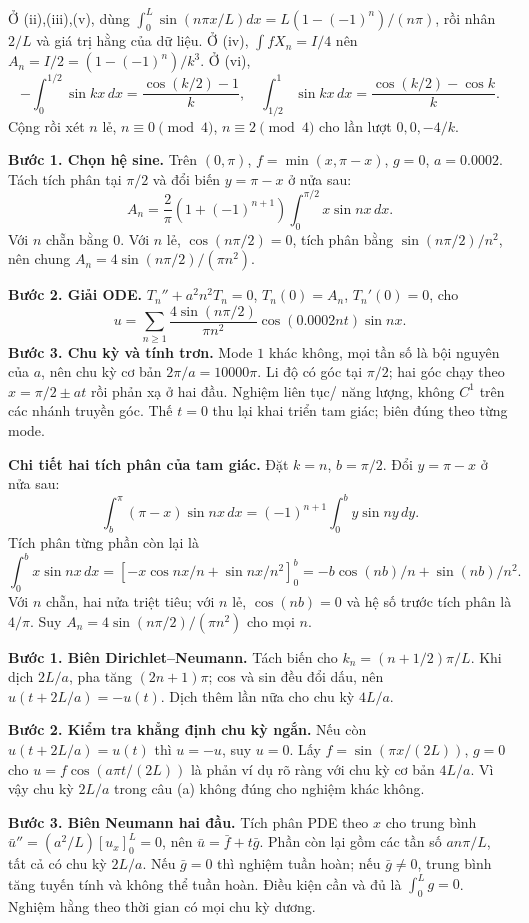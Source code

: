 Ở (ii),(iii),(v), dùng $\int_0^L\sin(n\pi x/L)dx=L(1-(-1)^n)/(n\pi)$, rồi nhân $2/L$ và giá trị hằng của dữ liệu. Ở (iv), $\int fX_n=I/4$ nên $A_n=I/2=(1-(-1)^n)/k^3$. Ở (vi),
\[-\int_0^{1/2}\sin kx\,dx=\frac{\cos(k/2)-1}{k},\quad
\int_{1/2}^1\sin kx\,dx=\frac{\cos(k/2)-\cos k}{k}.\]
Cộng rồi xét $n$ lẻ, $n\equiv0\pmod4$, $n\equiv2\pmod4$ cho lần lượt $0,0,-4/k$.

\textbf{Bước 1. Chọn hệ sine.} Trên $(0,\pi)$, $f=\min(x,\pi-x)$, $g=0$, $a=0.0002$. Tách tích phân tại $\pi/2$ và đổi biến $y=\pi-x$ ở nửa sau:
\[A_n=\frac2\pi(1+(-1)^{n+1})\int_0^{\pi/2}x\sin nx\,dx.\]
Với $n$ chẵn bằng $0$. Với $n$ lẻ, $\cos(n\pi/2)=0$, tích phân bằng $\sin(n\pi/2)/n^2$, nên chung $A_n=4\sin(n\pi/2)/(\pi n^2)$.

\textbf{Bước 2. Giải ODE.} $T_n''+a^2n^2T_n=0$, $T_n(0)=A_n$, $T_n'(0)=0$, cho
\[u=\sum_{n\ge1}\frac{4\sin(n\pi/2)}{\pi n^2}\cos(0.0002nt)\sin nx.\]
\textbf{Bước 3. Chu kỳ và tính trơn.} Mode $1$ khác không, mọi tần số là bội nguyên của $a$, nên chu kỳ cơ bản $2\pi/a=10000\pi$. Li độ có góc tại $\pi/2$; hai góc chạy theo $x=\pi/2\pm at$ rồi phản xạ ở hai đầu. Nghiệm liên tục/ năng lượng, không $C^1$ trên các nhánh truyền góc. Thế $t=0$ thu lại khai triển tam giác; biên đúng theo từng mode.

\textbf{Chi tiết hai tích phân của tam giác.} Đặt $k=n$, $b=\pi/2$. Đổi $y=\pi-x$ ở nửa sau:
\[\int_b^\pi(\pi-x)\sin nx\,dx=(-1)^{n+1}\int_0^b y\sin ny\,dy.\]
Tích phân từng phần còn lại là
\[\int_0^b x\sin nx\,dx=\left[-x\cos nx/n+\sin nx/n^2\right]_0^b
=-b\cos(nb)/n+\sin(nb)/n^2.\]
Với $n$ chẵn, hai nửa triệt tiêu; với $n$ lẻ, $\cos(nb)=0$ và hệ số trước tích phân là $4/\pi$. Suy $A_n=4\sin(n\pi/2)/(\pi n^2)$ cho mọi $n$.

\textbf{Bước 1. Biên Dirichlet–Neumann.} Tách biến cho $k_n=(n+1/2)\pi/L$. Khi dịch $2L/a$, pha tăng $(2n+1)\pi$; cos và sin đều đổi dấu, nên $u(t+2L/a)=-u(t)$. Dịch thêm lần nữa cho chu kỳ $4L/a$.

\textbf{Bước 2. Kiểm tra khẳng định chu kỳ ngắn.} Nếu còn $u(t+2L/a)=u(t)$ thì $u=-u$, suy $u=0$. Lấy $f=\sin(\pi x/(2L))$, $g=0$ cho $u=f\cos(a\pi t/(2L))$ là phản ví dụ rõ ràng với chu kỳ cơ bản $4L/a$. Vì vậy chu kỳ $2L/a$ trong câu (a) không đúng cho nghiệm khác không.

\textbf{Bước 3. Biên Neumann hai đầu.} Tích phân PDE theo $x$ cho trung bình $\bar u''=(a^2/L)[u_x]_0^L=0$, nên $\bar u=\bar f+t\bar g$. Phần còn lại gồm các tần số $an\pi/L$, tất cả có chu kỳ $2L/a$. Nếu $\bar g=0$ thì nghiệm tuần hoàn; nếu $\bar g\ne0$, trung bình tăng tuyến tính và không thể tuần hoàn. Điều kiện cần và đủ là $\int_0^Lg=0$. Nghiệm hằng theo thời gian có mọi chu kỳ dương.

